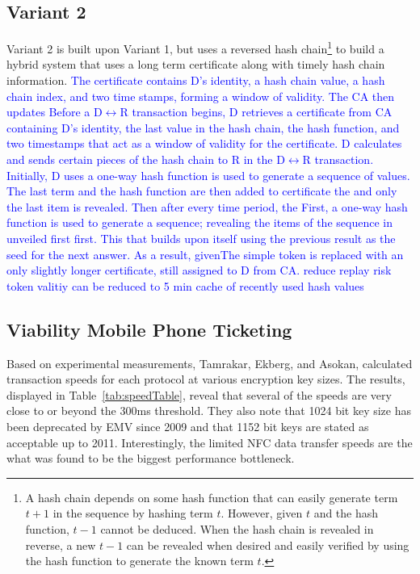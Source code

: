 \documentclass{sig-alternate}
\begin{document}
\subsection{Variant 2}
Variant 2 is built upon Variant 1, but uses a reversed hash chain\footnote{
A hash chain depends on some hash function that can easily generate term $t+1$ in the sequence by hashing term $t$. However, given $t$ and the hash function, $t-1$ cannot be deduced. When the hash chain is revealed in reverse, a new $t-1$ can be revealed when desired and easily verified by using the hash function to generate the known term $t$.
} to build a hybrid system that uses a long term certificate along with timely hash chain information. \textcolor{blue}{The certificate contains D's identity, a hash chain value, a hash chain index, and two time stamps, forming a window of validity. The CA then updates
Before a D$\leftrightarrow$R transaction begins, D retrieves a certificate from CA containing D's identity, the last value in the hash chain, the hash function, and two timestamps that act as a window of validity for the certificate. D calculates and sends certain pieces of the hash chain to R in the D$\leftrightarrow$R transaction. Initially, D uses a one-way hash function is used to generate a sequence of values. The last term and the hash function are then added to certificate the and only the last item is revealed. Then after every time period, the First, a one-way hash function is used to generate a sequence; revealing the items of the sequence in unveiled first first.
This  that builds upon itself using the previous result as the seed for the next answer. As a result, givenThe simple token is replaced with an only slightly longer certificate, still assigned to D from CA.
reduce replay risk
 token valitiy can be reduced to 5 min
 cache of recently used  hash values}

\subsection{Viability Mobile Phone Ticketing}
Based on experimental measurements, Tamrakar, Ekberg, and Asokan, calculated transaction speeds for each protocol at various encryption key sizes. The results, displayed in Table~\ref{tab:speedTable}, reveal that several of the speeds are very close to or beyond the 300ms threshold. They also note that 1024 bit key size has been deprecated by EMV since 2009 and that 1152 bit keys are stated as acceptable up to 2011. Interestingly, the limited NFC data transfer speeds are the what was found to be the biggest performance bottleneck. 
\end{document}
